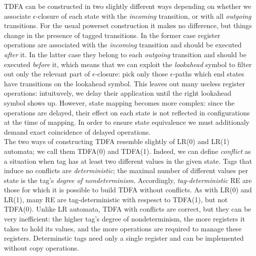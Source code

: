\documentclass{article}
\theoremstyle{definition}
\begin{document}
\begin{multicols}{2}
TDFA can be constructed in two slightly different ways
depending on whether we associate $\epsilon$-closure of each state with the \emph{incoming} transition,
or with all \emph{outgoing} transitions.
For the usual powerset construction it makes no difference, but things change in the presence of tagged transitions.
In the former case register operations are associated with the \emph{incoming} transition and should be executed \emph{after} it.
In the latter case they belong to each \emph{outgoing} transition and should be executed \emph{before} it,
which means that we can exploit the \emph{lookahead} symbol to filter out only the relevant part of $\epsilon$-closure:
pick only those $\epsilon$-paths which end states have transitions on the lookahead symbol.
This leaves out many useless register operations:
intuituvely, we delay their application until the right lookahead symbol shows up.
However, state mapping becomes more complex:
since the operations are delayed,
their effect on each state is not reflected in configurations at the time of mapping.
In order to ensure state equivalence we must additionaly demand exact coincidence of delayed operations.
\\

The two ways of constructing TDFA resemble slightly of LR(0) and LR(1) automata; we call them TDFA(0) and TDFA(1).
Indeed, we can define \emph{conflict} as a situation when tag has at least two different values in the given state.
Tags that induce no conflicts are \emph{deterministic};
the maximal number of different values per state is the tag's \emph{degree of nondeterminism}.
Accordingly, \emph{tag-deterministic} RE are those for which it is possible to build TDFA without conflicts.
As with LR(0) and LR(1), many RE are tag-deterministic with respesct to TDFA(1), but not TDFA(0).
Unlike LR automata, TDFA with conflicts are correct, but they can be very inefficient:
the higher tag's degree of nondeterminism, the more registers it takes to hold its values,
and the more operations are required to manage these registers.
Determinstic tags need only a single register and can be implemented without copy operations.
\\


\end{multicols}
\end{document}
